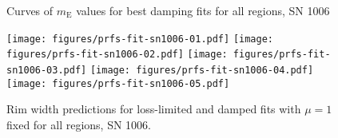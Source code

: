 \documentclass[iop, apj, numberedappendix]{emulateapj}
\newcommand*{\mt}{\mathrm}
\newcommand*{\mE}{m_\mt{E}}
\begin{document}
\clearpage
\begin{figure}
    \centering
    \iftoggle{manuscript}{
        \texttt{[image: figures/mE-damp-sn1006.pdf]}
    }{
        \texttt{[image: figures/mE-damp-sn1006.pdf]}
    }
    \caption{Curves of $\mE$ values for best damping fits for all regions,
        SN 1006}
\end{figure}

\begin{figure*}[h]
    \centering
    \texttt{[image: figures/prfs-fit-sn1006-01.pdf]}
    \texttt{[image: figures/prfs-fit-sn1006-02.pdf]}
    \texttt{[image: figures/prfs-fit-sn1006-03.pdf]}
    \texttt{[image: figures/prfs-fit-sn1006-04.pdf]}
    \texttt{[image: figures/prfs-fit-sn1006-05.pdf]}
    \caption{Rim width predictions for loss-limited and damped fits with
    $\mu = 1$ fixed for all regions, SN 1006.}
\end{figure*}

\end{document}
